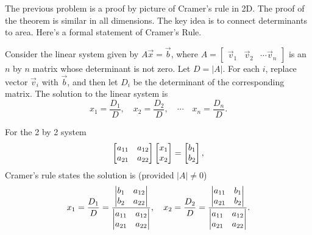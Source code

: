 The previous problem is a proof by picture of Cramer's rule in 2D. The proof of the theorem is similar in all dimensions. The key idea is to connect determinants to area.  
Here's a formal statement of Cramer's Rule.
\begin{theorem}\label{Cramer's Rule}
 Consider the linear system given by $A\vec x = \vec b$, where 
$A=\begin{bmatrix}\vec v_1 &\vec v_2 &\cdots \vec v_n \end{bmatrix}$
is an $n$ by $n$ matrix whose determinant is not zero.  Let $D=|A|$. For each $i$, replace vector $\vec v_i$ with $\vec b$, and then let $D_i$ be the determinant of the corresponding matrix. The solution to the linear system is
$$x_1 = \frac{D_1}{D},\quad x_2 = \frac{D_2}{D},\quad \cdots \quad x_n = \frac{D_n}{D}.$$

For the 2 by 2 system
$$
\begin{bmatrix}\begin{matrix} a_{11}\\a_{21} \end{matrix}&\begin{matrix} a_{12}\\a_{22} \end{matrix} \end{bmatrix}
\begin{bmatrix}\begin{matrix} x_{1}\\x_{2} \end{matrix} \end{bmatrix}
=
\begin{bmatrix}\begin{matrix} b_{1}\\b_{2} \end{matrix} \end{bmatrix},
$$
Cramer's rule states the solution is (provided $|A|\neq 0$) 
$$
x_1 = \frac{D_1}{D}=\frac{\begin{vmatrix}\begin{matrix} b_1\\b_2 \end{matrix}&\begin{matrix} a_{12}\\a_{22} \end{matrix} \end{vmatrix}}{\begin{vmatrix}\begin{matrix} a_{11}\\a_{21} \end{matrix}&\begin{matrix} a_{12}\\a_{22} \end{matrix} \end{vmatrix}},
\quad 
x_2 = \frac{D_2}{D}=\frac{\begin{vmatrix}\begin{matrix} a_{11}\\a_{21} \end{matrix}&\begin{matrix} b_1\\b_2 \end{matrix}\end{vmatrix}}{\begin{vmatrix}\begin{matrix} a_{11}\\a_{21} \end{matrix}&\begin{matrix} a_{12}\\a_{22} \end{matrix} \end{vmatrix}}
.$$
\end{theorem}











